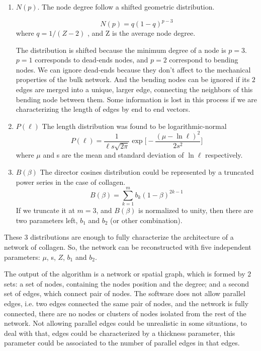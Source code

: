 \begin{enumerate} 
\item \textbf{$N(p)$}. The node degree follow a shifted geometric distribution.

\begin{equation} \label{degree-dist}
N(p)=q(1-q)^{p-3} 
\end{equation}
where $q=1/(Z-2)$ , and Z is the average node degree.

The distribution is shifted because the minimum degree of a node is $p=3$.$p=1$
corresponds to dead-ends nodes, and $p=2$ correspond to bending nodes. We can ignore dead-ends because they don't
affect to the mechanical properties of the bulk network. And the bending nodes
can be ignored if its $2$ edges are merged into a unique, larger edge,
connecting the neighbors of this bending node between them. Some information is lost in this
process if we are characterizing the length of edges by end to end
vectors.

\item \textbf{$P(\ell)$} The length distribution was found to be
logarithmic-normal
\begin{equation} \label{length-dist}
P(\ell)=\frac{1}{\ell
s\sqrt{2\pi}}\exp{\bigg[-\frac{(\mu-\ln{\ell})^2}{2s^2}\bigg]}
\end{equation}
where $\mu$ and s are the mean and standard deviation of $\ln{\ell}$
respectively.

\item \textbf{$B(\beta)$} The director cosines distribution could be represented
by a truncated power series in the case of collagen.
\begin{equation} \label{cosines-dist}
B(\beta)=\sum_{k=1}^{m} b_k(1-\beta)^{2k-1}
\end{equation}
If we truncate it at $m=3$, and $B(\beta)$ is normalized to unity, then there
are two parameters left, $b_1$ and $b_2$ (or other combination).
\end{enumerate}

These $3$ distributions are enough to fully characterize the architecture of a
network of collagen. So, the network can be reconstructed with five
independent parameters:
$\mu$, s, $Z$, $b_1$ and $b_2$.


The output of the algorithm is a network or spatial \gls{graph}, which is formed
by $2$ sets: a set of nodes, containing the nodes
position and the degree; and a second set of edges, which connect pair of
nodes. The software
does not allow parallel edges, i.e. two edges connected the same pair of nodes,
and the network is fully connected,  there are no nodes or clusters of nodes
isolated  from the rest of the network. Not allowing parallel edges could be
unrealistic in some situations, to deal with that, edges could be characterized
by a thickness parameter, this parameter could be associated to the number of
parallel edges in that edges.
